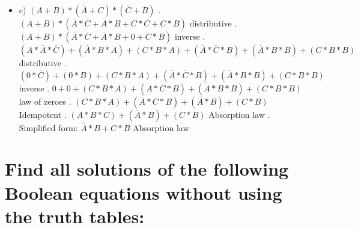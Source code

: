\documentclass{article}
\begin{document}
\begin{itemize}
    \item c) $(A + B) * (\overline{A} + C) * (\overline{C} + B)$ . $(A + B) * (\overline{A} * \overline{C} + \overline{A} * B + C * \overline{C} + C * B)$ distributive . $(A + B) * (\overline{A} * \overline{C} + \overline{A} * B + 0 + C * B)$ inverse . $(A * \overline{A} * \overline{C}) + (\overline{A} * B * A) + (C * B * A) + (\overline{A} * \overline{C} * B) + (\overline{A} * B * B) + (C * B * B)$ distributive . $(0 * \overline{C}) + (0 * B) + (C * B * A) + (\overline{A} * \overline{C} * B) + (\overline{A} * B * B) + (C * B * B)$ inverse . $0 + 0 + (C * B * A) + (\overline{A} * \overline{C} * B) + (\overline{A} * B * B) + (C * B * B)$ law of zeroes . $(C * B * A) + (\overline{A} * \overline{C} * B) + (\overline{A} * B) + (C * B)$ Idempotent . $(A * B * C) + (\overline{A} * B) + (C * B)$ Absorption law . Simplified form: $\overline{A} * B + C * B$ Absorption law \newline
    
\end{itemize}

\section{Find all solutions of the following Boolean equations without using the truth tables:}
\end{document}
